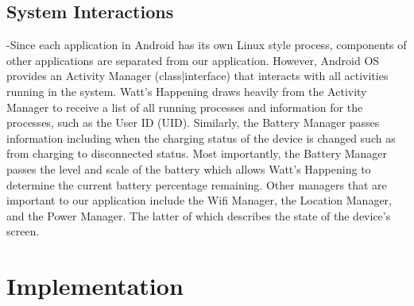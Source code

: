 \documentclass[11pt,twocolumn]{article}
\begin{document}
\subsection{System Interactions}
-Since each application in Android has its own Linux style process, components of other applications are separated from our application.  
However, Android OS provides an Activity Manager (class|interface) that interacts with all activities running in the system.  
Watt's Happening draws heavily from the Activity Manager to receive a list of all running processes and information for the processes, such as the User ID (UID).   
Similarly, the Battery Manager passes information including when the charging status of the 
device is changed such as from charging to disconnected status.  
Most importantly, the Battery Manager passes the level and scale of the battery which allows Watt's Happening to determine the current battery percentage remaining.  
Other managers that are important to our application include the Wifi Manager, the Location Manager, and the Power Manager.  
The latter of which describes the state of the device's screen. %


\section*{Implementation}
\end{document}
